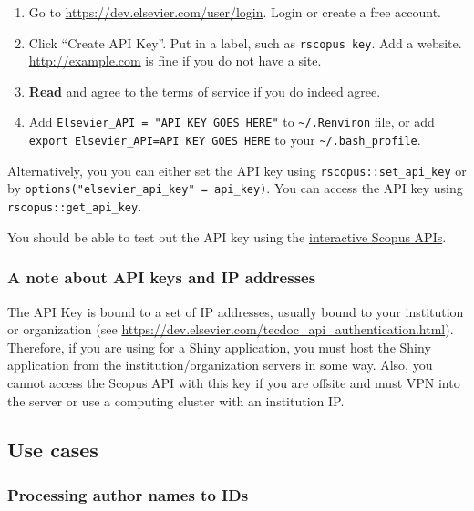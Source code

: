 \begin{enumerate}
\def\labelenumi{\arabic{enumi}.}
\tightlist
\item
  Go to \url{https://dev.elsevier.com/user/login}. Login or create a
  free account.
\item
  Click ``Create API Key''. Put in a label, such as
  \texttt{rscopus\ key}. Add a website. \url{http://example.com} is fine
  if you do not have a site.
\item
  \textbf{Read} and agree to the terms of service if you do indeed
  agree.
\item
  Add \texttt{Elsevier\_API\ =\ "API\ KEY\ GOES\ HERE"} to
  \texttt{\textasciitilde{}/.Renviron} file, or add
  \texttt{export\ Elsevier\_API=API\ KEY\ GOES\ HERE} to your
  \texttt{\textasciitilde{}/.bash\_profile}.
\end{enumerate}

Alternatively, you you can either set the API key using
\texttt{rscopus::set\_api\_key} or by
\texttt{options("elsevier\_api\_key"\ =\ api\_key)}. You can access the
API key using \texttt{rscopus::get\_api\_key}.

You should be able to test out the API key using the
\href{https://dev.elsevier.com/scopus.html}{interactive Scopus APIs}.

\hypertarget{a-note-about-api-keys-and-ip-addresses}{%
\subsubsection{A note about API keys and IP
addresses}\label{a-note-about-api-keys-and-ip-addresses}}

The API Key is bound to a set of IP addresses, usually bound to your
institution or organization (see
\url{https://dev.elsevier.com/tecdoc_api_authentication.html}).
Therefore, if you are using  for a Shiny application, you
must host the Shiny application from the institution/organization
servers in some way. Also, you cannot access the Scopus API with this
key if you are offsite and must VPN into the server or use a computing
cluster with an institution IP.

\hypertarget{use-cases}{%
\subsection{Use cases}\label{use-cases}}

\hypertarget{processing-author-names-to-ids}{%
\subsubsection{Processing author names to
IDs}\label{processing-author-names-to-ids}}

